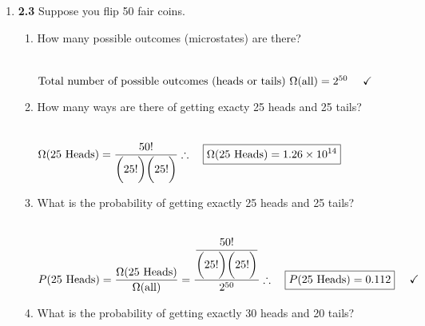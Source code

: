 \documentclass[fleqn]{article}
\begin{document}
\begin{enumerate}
\begin{enumerate}
    \end{enumerate}

    \pagebreak

    \item \textbf{2.3} Suppose you flip 50 fair coins.
    \begin{enumerate}
      \item How many possible outcomes (microstates) are there?

        \textcolor{hwColor}{
          \\
          $
            \text{Total number of possible outcomes (heads or tails) }
            \\
            \\
            \Omega(\text{all})=2^{50} ~~~~ \checkmark
            \\
            \\
          $
        }

      \item How many ways are there of getting exacty 25 heads and 25 tails?

        \textcolor{hwColor}{
          \\
          $
            \Omega(25 ~ \text{Heads})=\dfrac{50!}{\bigg( 25! \bigg) \bigg( 25! \bigg)}
            \\
            \\
            \therefore ~~~ \boxed{
              \Omega(25 ~ \text{Heads})=1.26 \times 10^{14}
            }
            \\
            \\
          $
        }

      \item What is the probability of getting exactly 25 heads and 25 tails?

        \textcolor{hwColor}{
          \\
          $
            P(25 ~ \text{Heads})=\dfrac{\Omega(25 ~ \text{Heads})}{\Omega(\text{all})}
            =\dfrac{
              \dfrac{50!}{\bigg( 25! \bigg) \bigg( 25! \bigg)}
            }{
              2^{50}
            }
            \\
            \\
            \therefore ~~~ \boxed{
              P(25 ~ \text{Heads})=0.112
            } ~~~~ \checkmark
            \\
            \\
          $
        }

      \item What is the probability of getting exactly 30 heads and 20 tails?
      

\end{enumerate}
\end{enumerate}
\end{document}
